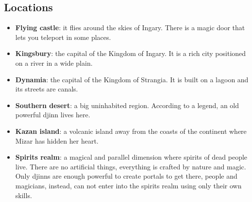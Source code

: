 \subsection{Locations}
\begin{itemize}
	\item \textbf{Flying castle}: it flies around the skies of Ingary. There is a magic door that lets you teleport in some places.
	\item \textbf{Kingsbury}: the capital of the Kingdom of Ingary. It is a rich city positioned on a river in a wide plain.
	\item \textbf{Dynamia}: the capital of the Kingdom of Strangia. It is built on a lagoon and its streets are canals.
	\item \textbf{Southern desert}: a big uninhabited region. According to a legend, an old powerful djinn lives here.
	\item \textbf{Kazan island}: a volcanic island away from the coasts of the continent where Mizar has hidden her heart.
	\item \textbf{Spirits realm}: a magical and parallel dimension where spirits of dead people live. There are no artificial things, everything is crafted by nature and magic. Only djinns are enough powerful to create portals to get there, people and magicians, instead, can not enter into the spirits realm using only their own skills.


\end{itemize}
